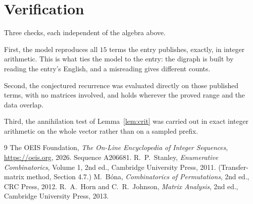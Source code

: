 \documentclass[11pt,a4paper]{article}
\theoremstyle{plain}
\theoremstyle{definition}
\begin{document}
\section{Verification}

Three checks, each independent of the algebra above.

First, the model reproduces all $15$ terms the entry publishes, exactly, in integer
arithmetic. This is what ties the model to the entry: the digraph is built by reading the
entry's English, and a misreading gives different counts.

Second, the conjectured recurrence was evaluated directly on those published terms, with no
matrices involved, and holds wherever the proved range and the data overlap.

Third, the annihilation test of Lemma~\ref{lem:crit} was carried out in exact integer
arithmetic on the whole vector rather than on a sampled prefix.

\begin{thebibliography}{9}
 The OEIS Foundation, \emph{The On-Line Encyclopedia of Integer
Sequences}, \url{https://oeis.org}, 2026. Sequence A206681.
 R.~P.~Stanley, \emph{Enumerative Combinatorics}, Volume 1, 2nd ed.,
Cambridge University Press, 2011. (Transfer-matrix method, Section 4.7.)
 M.~B\'ona, \emph{Combinatorics of Permutations}, 2nd ed., CRC
Press, 2012.
 R.~A.~Horn and C.~R.~Johnson, \emph{Matrix Analysis}, 2nd ed., Cambridge
University Press, 2013.
\end{thebibliography}
\end{document}
